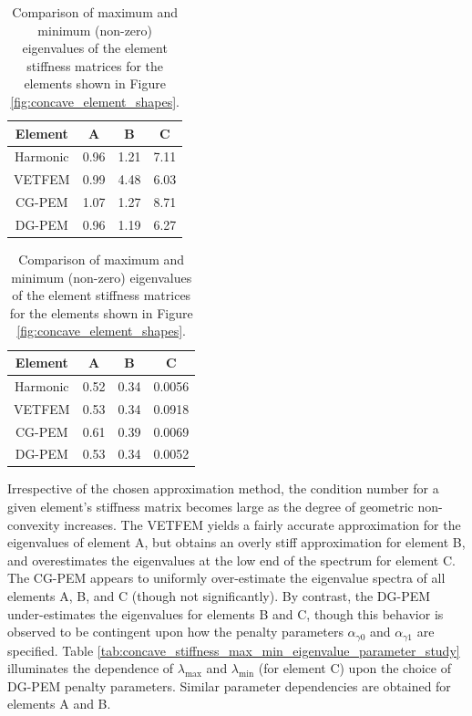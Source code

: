 \begin{table}
\centering
\begin{subtable}{.5\textwidth}
\centering
\begin{tabular}{| c || c | c | c |}
    \hline
		Element  & A      & B      & C \\ \hline \hline
		Harmonic	 & 0.96 & 1.21 & 7.11 \\ \hline
		VETFEM	 & 0.99 & 4.48 & 6.03 \\ \hline
		CG-PEM	 & 1.07 & 1.27 & 8.71 \\ \hline
		DG-PEM	 & 0.96 & 1.19 & 6.27 \\
    \hline
    \end{tabular}
    \caption{Largest eigenvalue: $\lambda_{\max}$}
    \label{tab:concave_stiffness_max_eigenvalue}
\end{subtable}%
\begin{subtable}{.5\textwidth}
\centering
\begin{tabular}{| c || c | c | c |}
    \hline
		Element  & A      & B      & C \\ \hline \hline
		Harmonic	 & 0.52 & 0.34 & 0.0056 \\ \hline
		VETFEM   & 0.53 & 0.34 & 0.0918 \\ \hline
		CG-PEM   & 0.61 & 0.39 & 0.0069 \\ \hline
		DG-PEM   & 0.53 & 0.34 & 0.0052 \\
    \hline
    \end{tabular}
    \caption{Smallest (non-zero) eigenvalue: $\lambda_{\min}$}
    \label{tab:concave_stiffness_min_eigenvalue}
\end{subtable}

\caption{Comparison of maximum and minimum (non-zero) eigenvalues of the element stiffness matrices for the elements shown in Figure \ref{fig:concave_element_shapes}.}
\label{tab:concave_stiffness_max_min_eigenvalue}
\end{table}

Irrespective of the chosen approximation method, the condition number for a given element's stiffness matrix becomes large as the degree of geometric non-convexity increases. The VETFEM yields a fairly accurate approximation for the eigenvalues of element A, but obtains an overly stiff approximation for element B, and overestimates the eigenvalues at the low end of the spectrum for element C. The CG-PEM appears to uniformly over-estimate the eigenvalue spectra of all elements A, B, and C (though not significantly). By contrast, the DG-PEM under-estimates the eigenvalues for elements B and C, though this behavior is observed to be contingent upon how the penalty parameters $\alpha_{\gamma0}$ and $\alpha_{\gamma1}$ are specified. Table \ref{tab:concave_stiffness_max_min_eigenvalue_parameter_study} illuminates the dependence of $\lambda_{\max}$ and $\lambda_{\min}$ (for element C) upon the choice of DG-PEM penalty parameters. Similar parameter dependencies are obtained for elements A and B.

